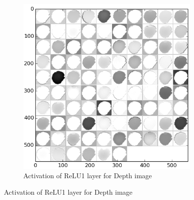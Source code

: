 \begin{figure}
\begin{subfigure}[b]{0.45\linewidth}
		\includegraphics[width=\textwidth]{img/relu1_dep.png}
		\caption{Activation of ReLU1 layer for Depth image}
	\end{subfigure}
	

\end{figure}
